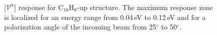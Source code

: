\documentclass[prb,11pt,tightenlines,twocolumn,aps]{revtex4-1}
\begin{document}
\begin{figure}[t]
    \centering
    \\
    \caption{$|\mathcal{V}^{\mathrm{x}}|$ response for C$_{16}$H$_{8}$-up
    structure. The maximum response zone is localized for an energy range from
    0.04\,eV to 0.12\,eV and for a polarization angle of the
    incoming beam from 25$^{\circ}$ to 50$^{\circ}$.}
    \label{fig:up-3d-1}
\end{figure}
\end{document}

